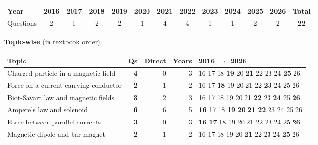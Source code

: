 {\small\setlength{\tabcolsep}{3.5pt}
\begin{tabular*}{\linewidth}{@{\extracolsep{\fill}}l*{11}{c}c@{}}\toprule
Year & 2016 & 2017 & 2018 & 2019 & 2020 & 2021 & 2022 & 2023 & 2024 & 2025 & 2026 & Total\\\midrule
Questions & 2 & 1 & 2 & 2 & 1 & 4 & 4 & 1 & 1 & 2 & 2 & \textbf{22}\\\bottomrule\end{tabular*}}\par\medskip
{\small\textbf{\color{crimson}Topic-wise} (in textbook order)\par\smallskip
\begin{tabularx}{\linewidth}{@{}>{\raggedright\arraybackslash}Xrrrl@{}}\toprule
Topic & Qs & Direct & Years & 2016 $\rightarrow$ 2026\\\midrule
Charged particle in a magnetic field & \textbf{4} & 0 & 3 & {\scriptsize {\color{gray!45}16} {\color{gray!45}17} {\color{gray!45}18} \textbf{19} {\color{gray!45}20} \textbf{21} {\color{gray!45}22} {\color{gray!45}23} {\color{gray!45}24} \textbf{25} {\color{gray!45}26}}\\
Force on a current-carrying conductor & \textbf{2} & 1 & 2 & {\scriptsize {\color{gray!45}16} {\color{gray!45}17} \textbf{18} {\color{gray!45}19} {\color{gray!45}20} {\color{gray!45}21} {\color{gray!45}22} \textbf{23} {\color{gray!45}24} {\color{gray!45}25} {\color{gray!45}26}}\\
Biot-Savart law and magnetic fields & \textbf{3} & 2 & 3 & {\scriptsize {\color{gray!45}16} {\color{gray!45}17} {\color{gray!45}18} {\color{gray!45}19} {\color{gray!45}20} {\color{gray!45}21} \textbf{22} {\color{gray!45}23} \textbf{24} {\color{gray!45}25} \textbf{26}}\\
Ampere's law and solenoid & \textbf{6} & 6 & 5 & {\scriptsize \textbf{16} {\color{gray!45}17} {\color{gray!45}18} \textbf{19} \textbf{20} \textbf{21} \textbf{22} {\color{gray!45}23} {\color{gray!45}24} {\color{gray!45}25} {\color{gray!45}26}}\\
Force between parallel currents & \textbf{3} & 0 & 3 & {\scriptsize \textbf{16} \textbf{17} {\color{gray!45}18} {\color{gray!45}19} {\color{gray!45}20} {\color{gray!45}21} {\color{gray!45}22} {\color{gray!45}23} {\color{gray!45}24} {\color{gray!45}25} \textbf{26}}\\
Magnetic dipole and bar magnet & \textbf{2} & 1 & 2 & {\scriptsize {\color{gray!45}16} {\color{gray!45}17} {\color{gray!45}18} {\color{gray!45}19} {\color{gray!45}20} \textbf{21} {\color{gray!45}22} {\color{gray!45}23} {\color{gray!45}24} \textbf{25} {\color{gray!45}26}}\\

\end{tabularx}}
